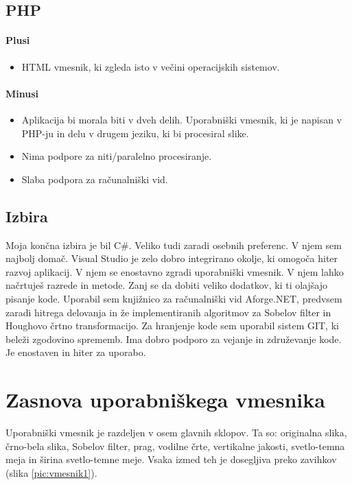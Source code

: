 \documentclass[oneside, a4paper, 12pt]{book}
\begin{document}
\subsection{PHP}
\paragraph{Plusi}
\begin{itemize}
\item HTML vmesnik, ki zgleda isto v večini operacijskih sistemov.
\end{itemize}
\paragraph{Minusi}
\begin{itemize}
\item Aplikacija bi morala biti v dveh delih. Uporabniški vmesnik, ki je napisan v PHP-ju in delu v drugem jeziku, ki bi procesiral slike.
\item Nima podpore za niti/paralelno procesiranje.
\item Slaba podpora za računalniški vid.
\end{itemize}

\subsection{Izbira}
Moja končna izbira je bil C\#. Veliko tudi zaradi osebnih preferenc. V njem sem najbolj domač. Visual Studio je zelo dobro integrirano okolje, ki omogoča hiter razvoj aplikacij. V njem se enostavno zgradi uporabniški vmesnik. V njem lahko načrtuješ razrede in metode. Zanj se da dobiti veliko dodatkov, ki ti olajšajo pisanje kode. Uporabil sem knjižnico za računalniški vid Aforge.NET, predvsem zaradi hitrega delovanja in že implementiranih algoritmov za Sobelov filter in Houghovo črtno transformacijo. Za hranjenje kode sem uporabil sistem GIT, ki beleži zgodovino sprememb. Ima dobro podporo za vejanje in združevanje kode. Je enostaven in hiter za uporabo.

\section{Zasnova uporabniškega vmesnika}
Uporabniški vmesnik je razdeljen v osem glavnih sklopov. Ta so: originalna slika, črno-bela slika, Sobelov filter, prag, vodilne črte, vertikalne jakosti, svetlo-temna meja in širina svetlo-temne meje. Vsaka izmed teh je dosegljiva preko zavihkov (slika \ref{pic:vmesnik1}).
\end{document}
